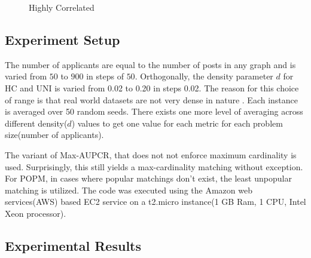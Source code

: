 \documentclass[letterpaper]{article} %
\begin{document}
\begin{figure}[t]
{	}
    \caption{Highly Correlated}
\end{figure}

\subsection{Experiment Setup}
The number of applicants are equal to the number of posts in any graph and is varied from $50$ to $900$ in steps of $50$. Orthogonally, the density parameter $d$ for HC and UNI is varied from 0.02 to 0.20 in steps 0.02. The reason for this choice of range is that real world datasets are not very dense in nature . Each instance is averaged over 50 random seeds. There exists one more level of averaging across different density($d$) values to get one value for each metric for each problem size(number of applicants).

The variant of Max-AUPCR, that does not not enforce maximum cardinality is used. Surprisingly, this still yields a max-cardinality matching without exception. For POPM, in cases where popular matchings don't exist, the least unpopular matching is utilized. The code was executed using the Amazon web services(AWS) based EC2 service on a t2.micro instance(1 GB Ram, 1 CPU, Intel Xeon processor).
\subsection{Experimental Results}
\end{document}
